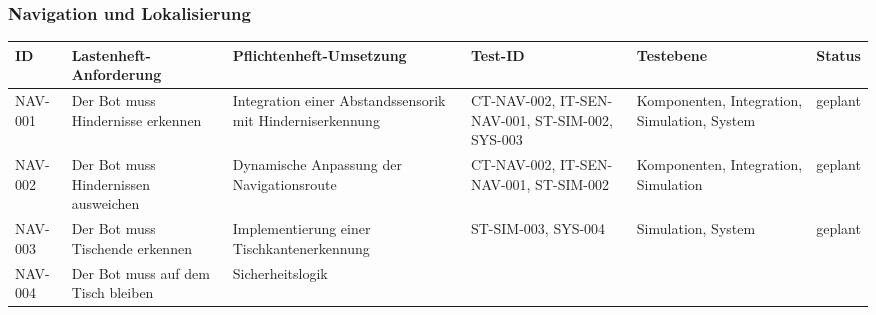 \documentclass[
  a4paper,
  12pt,
  DIV=12,        %
  parskip=half,  %
  headings=small %
]{scrartcl}
\theoremstyle{definition}
\theoremstyle{definition}
\begin{document}
\begin{landscape}
\subsubsection{Navigation und
Lokalisierung}\label{navigation-und-lokalisierung-1}

\begin{longtable}[]{@{}
  >{\raggedright\arraybackslash}p{}
  >{\raggedright\arraybackslash}p{}
  >{\raggedright\arraybackslash}p{}
  >{\raggedright\arraybackslash}p{}
  >{\raggedright\arraybackslash}p{}
  >{\raggedright\arraybackslash}p{}@{}}
\toprule\noalign{}
\begin{minipage}[b]{\linewidth}\raggedright
ID
\end{minipage} & \begin{minipage}[b]{\linewidth}\raggedright
Lastenheft-Anforderung
\end{minipage} & \begin{minipage}[b]{\linewidth}\raggedright
Pflichtenheft-Umsetzung
\end{minipage} & \begin{minipage}[b]{\linewidth}\raggedright
Test-ID
\end{minipage} & \begin{minipage}[b]{\linewidth}\raggedright
Testebene
\end{minipage} & \begin{minipage}[b]{\linewidth}\raggedright
Status
\end{minipage} \\
\midrule\noalign{}
\endhead
\bottomrule\noalign{}
\endlastfoot
NAV-001 & Der Bot muss Hindernisse erkennen & Integration einer
Abstandssensorik mit Hinderniserkennung & CT-NAV-002, IT-SEN-NAV-001,
ST-SIM-002, SYS-003 & Komponenten, Integration, Simulation, System &
geplant \\
NAV-002 & Der Bot muss Hindernissen ausweichen & Dynamische Anpassung
der Navigationsroute & CT-NAV-002, IT-SEN-NAV-001, ST-SIM-002 &
Komponenten, Integration, Simulation & geplant \\
NAV-003 & Der Bot muss Tischende erkennen & Implementierung einer
Tischkantenerkennung & ST-SIM-003, SYS-004 & Simulation, System &
geplant \\
NAV-004 & Der Bot muss auf dem Tisch bleiben & Sicherheitslogik

\end{longtable}
\end{landscape}
\end{document}
